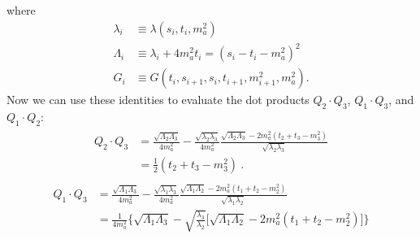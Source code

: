 where
\begin{align}
    \lambda_i &\equiv \lambda(s_i, t_i, m_a^2) \\
    \Lambda_i &\equiv \lambda_i + 4 m_a^2 t_i = (s_i - t_i - m_a^2)^2 \\
    G_i &\equiv G(t_i, s_{i+1}, s_i, t_{i+1}, m_{i+1}^2, m_a^2) . 
\end{align}
Now we can use these identities to evaluate the dot products $Q_2 \cdot Q_3$, $Q_1 \cdot Q_3$, and $Q_1 \cdot Q_2$:
\begin{gather}
    \begin{aligned}
        Q_2 \cdot Q_3 
        &= 
        \frac{\sqrt{\Lambda_2 \Lambda_3}}{4 m_a^2} 
        - \frac{\sqrt{\lambda_2 \lambda_3}}{4 m_a^2} 
        \frac{\sqrt{\Lambda_2 \Lambda_3} - 2m_a^2(t_2 + t_3 - m_3^2)}{\sqrt{\lambda_2 \lambda_3}} \\
        &= \frac{1}{2}(t_2 + t_3 - m_3^2) \ . 
    \end{aligned}
\end{gather}
\begin{gather}
    \begin{aligned}
        Q_1 \cdot Q_3 
        &= 
        \frac{\sqrt{\Lambda_1 \Lambda_3}}{4 m_a^2} 
            - \frac{\sqrt{\lambda_1 \lambda_3}}{4 m_a^2} 
            \frac{\sqrt{\Lambda_1 \Lambda_2} - 2m_a^2(t_1 + t_2 - m_2^2)}{\sqrt{\lambda_1 \lambda_2}} \\
            &= 
            \frac{1}{4 m_a^2}
            \bigg \{
                \sqrt{\Lambda_1 \Lambda_3} - \sqrt{\frac{\lambda_3}{\lambda_2}} 
                \big[
                    \sqrt{\Lambda_1 \Lambda_2} - 2 m_a^2(t_1 + t_2 - m_2^2)
                \big]
            \bigg \}
    \end{aligned}
\end{gather}
